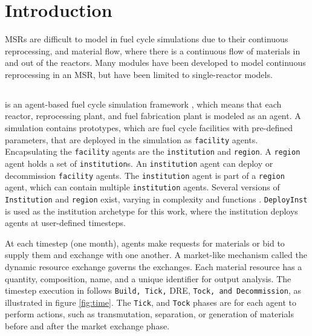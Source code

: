 
\section{Introduction}

\glspl{MSR} are difficult to model in fuel cycle
simulations due to their continuous reprocessing, and material
flow, where
there is a continuous flow of materials in and out of
the reactors. Many modules have been developed to model
continuous reprocessing in an \gls{MSR}, but have been limited
to single-reactor models. 



\subsection{\Cyclus}

\Cyclus is an agent-based fuel cycle simulation framework 
\cite{huff_fundamental_2016}, which means 
that each reactor, reprocessing plant, and fuel fabrication plant is modeled as an agent.
A \Cyclus simulation contains prototypes, which are fuel cycle facilities with
pre-defined parameters, that are deployed in the simulation as \texttt{facility} agents.
Encapsulating the \texttt{facility} agents are the \texttt{institution} and \texttt{region}.
A \texttt{region} agent holds a set of \texttt{institution}s.
An \texttt{institution} agent can deploy or decommission \texttt{facility} agents.
The \texttt{institution} agent is part of a \texttt{region} agent,
which can contain multiple \texttt{institution} agents. Several versions of \texttt{Institution}
and \texttt{region} exist, varying in complexity and functions \cite{huff_extensions_2014}.
 \texttt{DeployInst} is used as the institution archetype for this work, where the institution
deploys agents at user-defined timesteps.

At each timestep (one month),
agents make requests for materials or bid to supply them and exchange
with one another. A market-like mechanism called the dynamic resource exchange
\cite{gidden_agent-based_2015} governs the exchanges.
Each material resource has a quantity, composition, name, and a unique identifier
for output analysis. The timestep execution in \Cyclus follows 
\texttt{Build, Tick,} \gls{DRE}, \texttt{Tock, and Decommission}, as illustrated in
figure \ref{fig:time}. The \texttt{Tick}, and \texttt{Tock} phases are for
each agent to perform actions, such as transmutation, separation, or generation
of materials before and after the market exchange phase.

